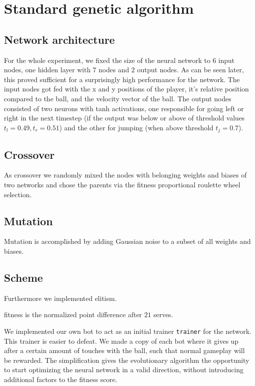 \documentclass[11pt,a4paper]{scrartcl}
\begin{document}
\section{Standard genetic algorithm}

\subsection{Network architecture}

For the whole experiment, we fixed the size of the neural network to $6$ input nodes, one hidden layer with $7$ nodes and $2$ output nodes. As can be seen later, this proved sufficient for a surprisingly high performance for the network. The input nodes got fed with the x and y positions of the player, it's relative position compared to the ball, and the velocity vector of the ball.
The output nodes consisted of two neurons with tanh activations, one responsible for going left or right in the next timestep (if the output was below or above of threshold values $t_l = 0.49, t_r = 0.51$) and the other for jumping (when above threshold $t_j = 0.7$).

\subsection{Crossover}

As crossover we randomly mixed the nodes with belonging weights and biases of two networks and chose the parents via the fitness proportional roulette wheel selection.


\subsection{Mutation}

Mutation is accomplished by adding Gaussian noise to a subset of all weights and biases.


\subsection{Scheme}

Furthermore we implemented elitism.

fitness is the normalized point difference after $21$ serves.

We implemented our own bot to act as an initial trainer \texttt{trainer} for the network.
This trainer is easier to defeat.
We made a copy of each bot where it gives up after a certain amount of touches with the ball, such that normal gameplay will be rewarded.
The simplification gives the evolutionary algorithm the opportunity to start optimizing the neural network in a valid direction, without introducing additional factors to the fitness score.
\end{document}
